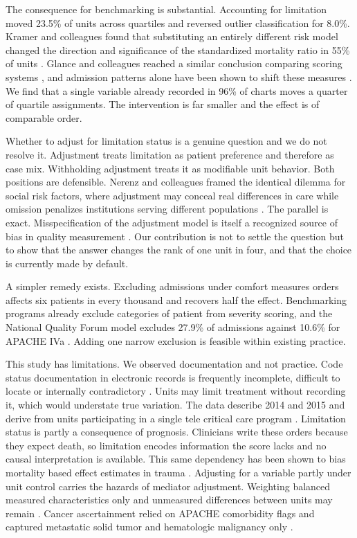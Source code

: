\documentclass[12pt,a4paper]{article}
\begin{document}
The consequence for benchmarking is substantial. Accounting for limitation moved
23.5\% of units across quartiles and reversed outlier classification for 8.0\%.
Kramer and colleagues found that substituting an entirely different risk model
changed the direction and significance of the standardized mortality ratio in
55\% of units \cite{ref22}. Glance and colleagues reached a similar conclusion
comparing scoring systems \cite{ref21}, and admission patterns alone have been
shown to shift these measures \cite{ref23}. We find that a single variable
already recorded in 96\% of charts moves a quarter of quartile assignments. The
intervention is far smaller and the effect is of comparable order.

Whether to adjust for limitation status is a genuine question and we do not
resolve it. Adjustment treats limitation as patient preference and therefore as
case mix. Withholding adjustment treats it as modifiable unit behavior. Both
positions are defensible. Nerenz and colleagues framed the identical dilemma for
social risk factors, where adjustment may conceal real differences in care while
omission penalizes institutions serving different populations \cite{ref44}. The
parallel is exact. Misspecification of the adjustment model is itself a
recognized source of bias in quality measurement \cite{ref25}. Our
contribution is not to settle the question but to show that the answer changes
the rank of one unit in four, and that the choice is currently made by default.

A simpler remedy exists. Excluding admissions under comfort measures orders
affects six patients in every thousand and recovers half the effect. Benchmarking
programs already exclude categories of patient from severity scoring, and the
National Quality Forum model excludes 27.9\% of admissions against 10.6\% for
APACHE IVa \cite{ref22}. Adding one narrow exclusion is feasible within existing practice.

This study has limitations. We observed documentation and not practice. Code
status documentation in electronic records is frequently incomplete, difficult to
locate or internally contradictory \cite{ref45}. Units may limit treatment
without recording it, which would understate true variation. The data describe
2014 and 2015 and derive from units participating in a single tele critical care
program \cite{ref30}. Limitation status is partly a consequence of prognosis.
Clinicians write these orders because they expect death, so limitation encodes
information the score lacks and no causal interpretation is available. This same
dependency has been shown to bias mortality based effect estimates in trauma
\cite{ref46}. Adjusting for a variable partly under unit control carries the
hazards of mediator adjustment. Weighting balanced measured
characteristics only and unmeasured differences between units may remain
\cite{ref37}. Cancer ascertainment relied on APACHE comorbidity flags and
captured metastatic solid tumor and hematologic malignancy only \cite{ref36}.
\end{document}
